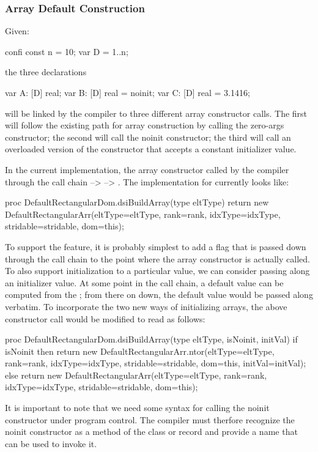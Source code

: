 \subsubsection{Array Default Construction}

Given:
\begin{chapel}
confi const n = 10;
var D = {1..n};
\end{chapel}
\noindent
the three declarations
\begin{chapel}
var A: [D] real;
var B: [D] real = noinit;
var C: [D] real = 3.1416;
\end{chapel}
\noindent
will be linked by the compiler to three different array constructor calls.  The first will
follow the existing path for array construction by calling the zero-args constructor; the
second will call the noinit constructor; the third will call an overloaded version of the
constructor that accepts a constant initializer value.

In the current implementation, the array constructor called by the compiler through the
call chain  --> 
--> .  The implementation for
 currently looks like:
\begin{chapel}
    proc DefaultRectangularDom.dsiBuildArray(type eltType) {
      return new DefaultRectangularArr(eltType=eltType, rank=rank, idxType=idxType,
                                      stridable=stridable, dom=this);
    }
\end{chapel}

To support the  feature, it is probably simplest to add a flag that is passed
down through the call chain to the point where the array constructor is actually called.
To also support initialization to a particular value, we can consider passing along an
initializer value.  At some point in the call chain, a default value can be computed from
the ; from there on down, the default value would be passed along verbatim.
To incorporate the two new ways of initializing arrays, the above constructor call would
be modified to read as follows:
\begin{chapel}
    proc DefaultRectangularDom.dsiBuildArray(type eltType, isNoinit, initVal) {
      if isNoinit then
        return new DefaultRectangularArr.ntor(eltType=eltType, rank=rank, idxType=idxType,
                                              stridable=stridable, dom=this, initVal=initVal);
      else
        return new DefaultRectangularArr(eltType=eltType, rank=rank, idxType=idxType,
                                         stridable=stridable, dom=this);
    }
\end{chapel}
It is important to note that we need some syntax for calling the noinit constructor under
program control.   The compiler must therfore recognize the noinit constructor 
as a method of the class or record and provide a name that can be used to invoke it.

